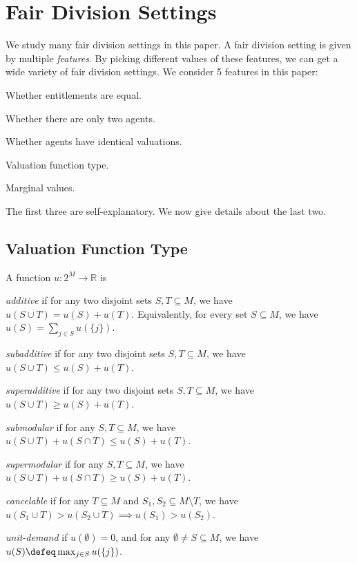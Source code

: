 \section{Fair Division Settings}
\label{sec:settings}

We study many fair division settings in this paper.
A fair division setting is given by multiple \emph{features}.
By picking different values of these features, we can get a wide variety of fair division settings.
We consider 5 features in this paper:
\begin{tightenum}
\item Whether entitlements are equal.
\item Whether there are only two agents.
\item Whether agents have identical valuations.
\item Valuation function type.
\item Marginal values.
\end{tightenum}
The first three are self-explanatory. We now give details about the last two.

\subsection{Valuation Function Type}

A function $u: 2^M \to \mathbb{R}$ is
\begin{tightenum}
\item \emph{additive} if for any two disjoint sets $S, T \subseteq M$, we have $u(S \cup T) = u(S) + u(T)$.
    Equivalently, for every set $S \subseteq M$, we have $u(S) = \sum_{j \in S} u(\{j\})$.
\item \emph{subadditive} if for any two disjoint sets $S, T \subseteq M$, we have $u(S \cup T) \le u(S) + u(T)$.
\item \emph{superadditive} if for any two disjoint sets $S, T \subseteq M$, we have $u(S \cup T) \ge u(S) + u(T)$.
\item \emph{submodular} if for any $S, T \subseteq M$, we have $u(S \cup T) + u(S \cap T) \le u(S) + u(T)$.
\item \emph{supermodular} if for any $S, T \subseteq M$, we have $u(S \cup T) + u(S \cap T) \ge u(S) + u(T)$.
\item \emph{cancelable} if for any $T \subseteq M$ and $S_1, S_2 \subseteq M \setminus T$,
    we have $u(S_1 \cup T) > u(S_2 \cup T) \implies u(S_1) > u(S_2)$.
\item \emph{unit-demand} if $u(\emptyset) = 0$, and for any $\emptyset \neq S \subseteq M$,
    we have $u(S) \defeq \max_{j \in S} u(\{j\})$.
\end{tightenum}

